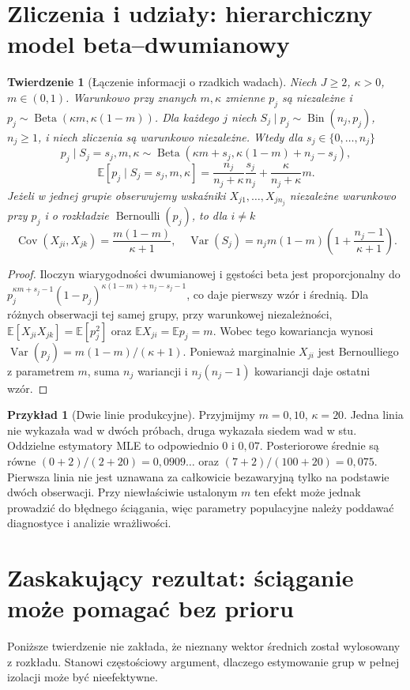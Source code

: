 \documentclass[11pt,a4paper,oneside]{report}
\numberwithin{equation}{chapter}
\theoremstyle{plain}
\newtheorem{twierdzenie}{Twierdzenie}[chapter]
\theoremstyle{definition}
\newtheorem{przyklad}{Przykład}[chapter]
\theoremstyle{remark}
\newcommand{\E}{\mathbb E}
\newcommand{\Var}{\operatorname{Var}}
\newcommand{\Cov}{\operatorname{Cov}}
\DeclareMathOperator{\Bin}{Bin}
\begin{document}
\section{Zliczenia i udziały: hierarchiczny model beta--dwumianowy}
\begin{twierdzenie}[Łączenie informacji o rzadkich wadach]
\label{thm:hierarchical-beta-binomial}
Niech $J\ge2$, $\kappa>0$, $m\in(0,1)$.
Warunkowo przy znanych $m,\kappa$ zmienne $p_j$ są niezależne
i $p_j\sim\operatorname{Beta}(\kappa m,\kappa(1-m))$.
Dla każdego $j$ niech $S_j\mid p_j\sim\Bin(n_j,p_j)$,
$n_j\ge1$, i niech zliczenia są warunkowo niezależne.
Wtedy dla $s_j\in\{0,\ldots,n_j\}$
\[
 p_j\mid S_j=s_j,m,\kappa
 \sim\operatorname{Beta}(\kappa m+s_j,\kappa(1-m)+n_j-s_j),
\]
\[
 \E[p_j\mid S_j=s_j,m,\kappa]
 =\frac{n_j}{n_j+\kappa}\frac{s_j}{n_j}
 +\frac{\kappa}{n_j+\kappa}m.
\]
Jeżeli w jednej grupie obserwujemy wskaźniki
$X_{j1},\ldots,X_{jn_j}$ niezależne warunkowo przy $p_j$
i o rozkładzie $\operatorname{Bernoulli}(p_j)$, to dla $i\ne k$
\[
 \Cov(X_{ji},X_{jk})=\frac{m(1-m)}{\kappa+1},\quad
 \Var(S_j)=n_jm(1-m)\left(1+\frac{n_j-1}{\kappa+1}\right).
\]
\end{twierdzenie}
\begin{proof}
Iloczyn wiarygodności dwumianowej i gęstości beta
jest proporcjonalny do
$p_j^{\kappa m+s_j-1}(1-p_j)^{\kappa(1-m)+n_j-s_j-1}$,
co daje pierwszy wzór i średnią. Dla różnych obserwacji
tej samej grupy, przy warunkowej niezależności,
$\E[X_{ji}X_{jk}]=\E[p_j^2]$ oraz
$\E X_{ji}=\E p_j=m$.
Wobec tego kowariancja wynosi
$\Var(p_j)=m(1-m)/(\kappa+1)$.
Ponieważ marginalnie $X_{ji}$ jest Bernoulliego
z parametrem $m$, suma $n_j$ wariancji i
$n_j(n_j-1)$ kowariancji daje ostatni wzór.
\end{proof}

\begin{przyklad}[Dwie linie produkcyjne]
Przyjmijmy $m=0{,}10$, $\kappa=20$. Jedna linia nie wykazała
wad w dwóch próbach, druga wykazała siedem wad w stu.
Oddzielne estymatory MLE to odpowiednio $0$ i $0{,}07$.
Posteriorowe średnie są równe
$(0+2)/(2+20)=0{,}0909\ldots$ oraz
$(7+2)/(100+20)=0{,}075$.
Pierwsza linia nie jest uznawana za całkowicie bezawaryjną
tylko na podstawie dwóch obserwacji. Przy niewłaściwie
ustalonym $m$ ten efekt może jednak prowadzić do błędnego
ściągania, więc parametry populacyjne należy poddawać
diagnostyce i analizie wrażliwości.
\end{przyklad}

\section{Zaskakujący rezultat: ściąganie może pomagać bez prioru}
Poniższe twierdzenie nie zakłada, że nieznany wektor średnich
został wylosowany z rozkładu. Stanowi częstościowy argument,
dlaczego estymowanie grup w pełnej izolacji może być nieefektywne.
\end{document}

